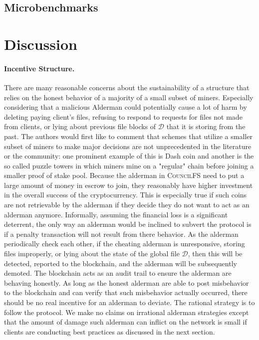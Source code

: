 \documentclass{article}
\begin{document}
\subsection{Microbenchmarks}

\section{Discussion}

\paragraph{Incentive Structure.} There are many reasonable concerns about the sustainability of a structure that relies on the honest behavior of a majority of a small subset of miners. Especially considering that a malicious Alderman could potentially cause a lot of harm by deleting paying client's files, refusing to respond to requests for files not made from clients, or lying about previous file blocks of $\mathcal{D}$ that it is storing from the past. The authors would first like to comment that schemes that utilize a smaller subset of miners to make major decisions are not unprecedented in the literature or the community: one prominent example of this is Dash coin and another is the so called puzzle towers in which miners mine on a "regular" chain before joining a smaller proof of stake pool. Because the alderman in \textsc{CouncilFS} need to put a large amount of money in escrow to join, they reasonably have higher investment in the overall success of the cryptocurrency. This is especially true if such coins are not retrievable by the alderman if they decide they do not want to act as an alderman anymore. Informally, assuming the financial loss is a significant deterrent, the only way an alderman would be inclined to subvert the protocol is if a penalty transaction will not result from there behavior. As the alderman periodically check each other, if the cheating alderman is unresponsive, storing files improperly, or lying about the state of the global file $\mathcal{D}$, then this will be detected, reported to the blockchain, and the alderman will be subsequently demoted. The blockchain acts as an audit trail to ensure the alderman are behaving honestly. As long as the honest alderman are able to post misbehavior to the blockchain and can verify that such misbehavior actually occurred, there should be no real incentive for an alderman to deviate. The rational strategy is to follow the protocol. We make no claims on irrational alderman strategies except that the amount of damage such alderman can inflict on the network is small if clients are conducting best practices as discussed in the next section. 
\end{document}
